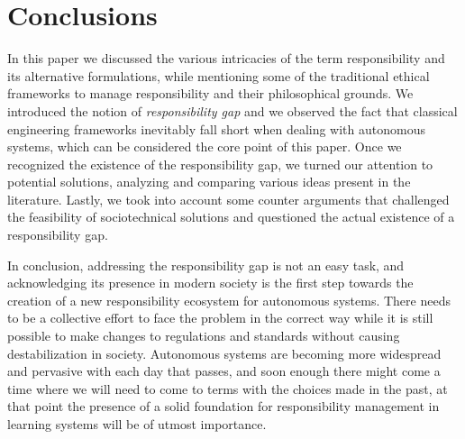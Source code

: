 \section{Conclusions}\label{sec:conclusions}

In this paper we discussed the various intricacies of the term responsibility and its alternative formulations, while mentioning some of the traditional ethical frameworks to manage responsibility and their philosophical grounds.
We introduced the notion of \textit{responsibility gap} and we observed the fact that classical engineering frameworks inevitably fall short when dealing with autonomous systems, which can be considered the core point of this paper.
Once we recognized the existence of the responsibility gap, we turned our attention to potential solutions, analyzing and comparing various ideas present in the literature.
Lastly, we took into account some counter arguments that challenged the feasibility of sociotechnical solutions and questioned the actual existence of a responsibility gap.

In conclusion, addressing the responsibility gap is not an easy task, and acknowledging its presence in modern society is the first step towards the creation of a new responsibility ecosystem for autonomous systems.
There needs to be a collective effort to face the problem in the correct way while it is still possible to make changes to regulations and standards without causing destabilization in society.
Autonomous systems are becoming more widespread and pervasive with each day that passes, and soon enough there might come a time where we will need to come to terms with the choices made in the past, at that point the presence of a solid foundation for responsibility management in learning systems will be of utmost importance.
